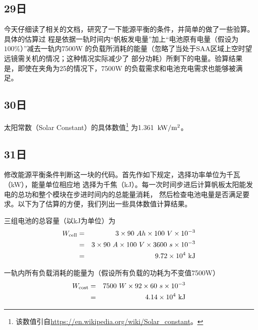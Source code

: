 \subsection{29日}
今天仔细读了相关的文档，研究了一下能源平衡的条件，并简单的做了一些验算。具体的估算过
程是依据一轨时间内“帆板发电量”加上“电池原有电量（假设为$100\%$）”减去一轨内7500W
的负载所消耗的能量（忽略了当处于SAA区域上空时望远镜需关机的情况；这种情况实际减少了
部分功耗）所剩下的电量。验算结果是，即使在夹角为{25\textdegree}的情况下，7500W
的负载需求和电池充电需求也能够被满足。


\subsection{30日}
太阳常数（Solar Constant）的具体数值\footnote{该数值引自\url{https://en.wikipedia.org/wiki/Solar_constant}。}
为1.361~$\rm kW/m^2$。

\subsection{31日}
修改能源平衡条件判断这一块的代码。首先作如下规定，选择功率单位为千瓦（kW），能量单位相应地
选择为千焦（kJ）。每一次时间步进后计算帆板太阳能发电的总功和整个模块在步进时间内的总能量消耗，
然后检查电池电量是否满足要求。以下为了估算的方便，我们列出一些具体数值计算结果。

三组电池的总容量（以kJ为单位）为
\begin{eqnarray}
W_{\rm cell}
 &=& 3\times 90~Ah \times 100~V \times 10^{-3} \nonumber\\
 &=& 3\times 90~A \times 100~V \times 3600~s \times 10^{-3} \nonumber\\
 &=& 9.72 \times 10^4~{\rm kJ}
\end{eqnarray}

一轨内所有负载消耗的能量为（假设所有负载的功耗为不变值7500W）
\begin{eqnarray}
W_{\rm cost}
 &=& 7500~W \times 92 \times 60~s \times 10^{-3} \nonumber\\
 &=& 4.14 \times 10^4~{\rm kJ}
\end{eqnarray}

